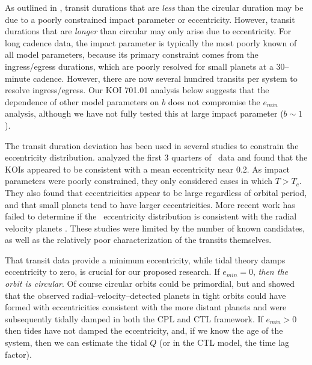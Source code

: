 As outlined in \cite{2008ApJ...678.1407F}, transit durations that are
{\it less} than the circular duration may be due to a poorly
constrained impact parameter or eccentricity.  However, transit
durations that are {\it longer} than circular may only arise due to
eccentricity.  For long cadence \kepler data, the impact parameter is
typically the most poorly known of all model parameters, because its
primary constraint comes from the ingress/egress durations, which are
poorly resolved for small planets at a 30--minute cadence.  However,
there are now several hundred transits per system to resolve
ingress/egress.  Our KOI 701.01 analysis below suggests that the
dependence of other model parameters on $b$ does not compromise the
$e_{min}$ analysis, although we have not fully tested this at large
impact parameter ($b \sim 1$).

The transit duration deviation has been used in several studies to
constrain the eccentricity distribution. \cite{Moorhead11} analyzed
the first 3 quarters of \kepler~data and found that the KOIs appeared
to be consistent with a mean eccentricity near 0.2. As impact
parameters were poorly constrained, they only considered cases in
which $T > T_c$. They also found that eccentricities appear to be
large regardless of orbital period, and that small planets tend to
have larger eccentricities. More recent work has failed to determine
if the \kepler~eccentricity distribution is consistent with the radial
velocity planets \citep{Plavchan12,Kane12}. These studies were limited
by the number of known candidates, as well as the relatively poor
characterization of the transits themselves.

\medskip
{\centerline{}}
\smallskip

That transit data provide a minimum eccentricity, while tidal theory
damps eccentricity to zero, is crucial for our proposed research. If
$e_{min} = 0$, \textit{then the orbit is circular}.  Of course
circular orbits could be primordial, but \cite{Jackson08}
and \cite{Matsumura10} showed that the observed
radial--velocity--detected planets in tight orbits could have formed
with eccentricities consistent with the more distant planets and were
subsequently tidally damped in both the CPL and CTL framework.  If
$e_{min} > 0$ then tides have not damped the eccentricity, and, if we
know the age of the system, then we can estimate the tidal $Q$ (or in
the CTL model, the time lag factor).

